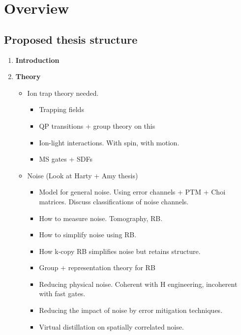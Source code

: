 \section{Overview}

\subsection*{Proposed thesis structure}
\begin{enumerate}
    \item \textbf{Introduction} 

    \item \textbf{Theory} 
    \begin{itemize}
        \item Ion trap theory needed. 
        \begin{itemize}
            \item Trapping fields
            \item QP transitions + group theory on this
            \item Ion-light interactions. With spin, with motion.
            \item MS gates + SDFs
        \end{itemize}
        \item Noise (Look at Harty + Amy thesis)
        \begin{itemize}
            \item Model for general noise. Using error channels + PTM + Choi matrices. Discuss classifications of noise channels.
            \item How to measure noise. Tomography, RB.
            \item How to simplify noise using RB.
            \item How k-copy RB simplifies noise but retains structure.
            \item Group + representation theory for RB
            \item Reducing physical noise. Coherent with H engineering, incoherent with fast gates.
            \item Reducing the impact of noise by error mitigation techniques.
            \item Virtual distillation on spatially correlated noise.
        \end{itemize}
    \end{itemize}


\end{enumerate}
